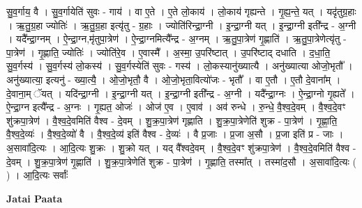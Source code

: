 \documentclass[17pt]{extarticle}
\begin{document}
सु॒व॒र्गाय॒ वै । सु॒व॒र्गायेति॑ सुवः - गाय॑ । वा ए॒ते । ए॒ते लो॒काय॑ । लो॒काय॑ गृह्यन्ते । गृ॒ह्य॒न्ते॒ यत् । यदृ॑तुग्र॒हाः । ऋ॒तु॒ग्र॒हा ज्योतिः॑ । ऋ॒तु॒ग्र॒हा इत्यृ॑तु - ग्र॒हाः । ज्योति॑रिन्द्रा॒ग्नी । इ॒न्द्रा॒ग्नी यत् । इ॒न्द्रा॒ग्नी इती᳚न्द्र - अ॒ग्नी । यदै᳚न्द्रा॒ग्नम् । ऐ॒न्द्रा॒ग्न,मृ॑तुपा॒त्रेण॑ । ऐ॒न्द्रा॒ग्नमित्यै᳚न्द्र - अ॒ग्नम् । ऋ॒तु॒पा॒त्रेण॑ गृ॒ह्णाति॑ । ऋ॒तु॒पा॒त्रेणेत्यृ॑तु - पा॒त्रेण॑ । गृ॒ह्णाति॒ ज्योतिः॑ । ज्योति॑रे॒व । ए॒वास्मै᳚ । अ॒स्मा॒ उ॒परि॑ष्टात् । उ॒परि॑ष्टाद् दधाति । द॒धा॒ति॒ सु॒व॒र्गस्य॑ । सु॒व॒र्गस्य॑ लो॒कस्य॑ । सु॒व॒र्गस्येति॑ सुवः - गस्य॑ । लो॒कस्यानु॑ख्यात्यै । अनु॑ख्यात्या ओजो॒भृतौ᳚ । अनु॑ख्यात्या॒ इत्यनु॑ - ख्या॒त्यै॒ । ओ॒जो॒भृतौ॒ वै । ओ॒जो॒भृता॒वित्यो॑जः - भृतौ᳚ । वा ए॒तौ । ए॒तौ दे॒वाना᳚म् । दे॒वाना॒म् ॅयत् । यदि॑न्द्रा॒ग्नी । इ॒न्द्रा॒ग्नी यत् । इ॒न्द्रा॒ग्नी इती᳚न्द्र - अ॒ग्नी । यदै᳚न्द्रा॒ग्नः । ऐ॒न्द्रा॒ग्नो गृ॒ह्यते᳚ । ऐ॒न्द्रा॒ग्न इत्यै᳚न्द्र - अ॒ग्नः । गृ॒ह्यत॒ ओजः॑ । ओज॑ ए॒व । ए॒वाव॑ । अव॑ रुन्धे । रु॒न्धे॒ वै॒श्व॒दे॒वम् । वै॒श्व॒दे॒वꣳ शु॑क्रपा॒त्रेण॑ । वै॒श्व॒दे॒वमिति॑ वैश्व - दे॒वम् । शु॒क्र॒पा॒त्रेण॑ गृह्णाति । शु॒क्र॒पा॒त्रेणेति॑ शुक्र - पा॒त्रेण॑ । गृ॒ह्णा॒ति॒ वै॒श्व॒दे॒व्यः॑ । वै॒श्व॒दे॒व्यो॑ वै । वै॒श्व॒दे॒व्य॑ इति॑ वैश्व - दे॒व्यः॑ । वै प्र॒जाः । प्र॒जा अ॒सौ । प्र॒जा इति॑ प्र - जाः । अ॒सावा॑दि॒त्यः । आ॒दि॒त्यः शु॒क्रः । शु॒क्रो यत् । यद् वै᳚श्वदे॒वम् । वै॒श्व॒दे॒वꣳ शु॑क्रपा॒त्रेण॑ । वै॒श्व॒दे॒वमिति॑ वैश्व - दे॒वम् । शु॒क्र॒पा॒त्रेण॑ गृ॒ह्णाति॑ । शु॒क्र॒पा॒त्रेणेति॑ शुक्र - पा॒त्रेण॑ । गृ॒ह्णाति॒ तस्मा᳚त् । तस्मा॑द॒सौ । अ॒सावा॑दि॒त्यः ( ) । आ॒दि॒त्यः सर्वाः᳚ \newline

\textbf{Jatai Paata} \newline
\end{document}
